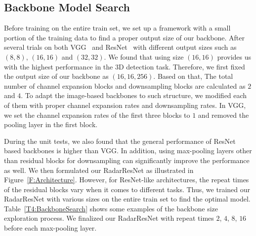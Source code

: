 \documentclass[10pt, conference, compsocconf]{IEEEtran}
\begin{document}

\subsection{Backbone Model Search}

Before training on the entire train set, we set up a framework with a small portion of the training data to find a proper output size of our backbone. After several trials on both VGG~\cite{BG:VGG} and ResNet~\cite{BG:ResNet} with different output sizes such as $(8, 8)$, $(16, 16)$ and $(32, 32)$. We found that using size $(16, 16)$ provides us with the highest performance in the 3D detection task. Therefore, we first fixed the output size of our backbone as $(16, 16, 256)$. Based on that, The total number of channel expansion blocks and downsampling blocks are calculated as $2$ and $4$. To adapt the image-based backbones to such structure, we modified each of them with proper channel expansion rates and downsampling rates. In VGG, we set the channel expansion rates of the first three blocks to $1$ and removed the pooling layer in the first block.

During the unit tests, we also found that the general performance of ResNet based backbones is higher than VGG. In addition, using max-pooling layers other than residual blocks for downsampling can significantly improve the performance as well. We then formulated our RadarResNet as illustrated in Figure~\ref{F:Architecture}. However, for ResNet-like architectures, the repeat times of the residual blocks vary when it comes to different tasks. Thus, we trained our RadarResNet with various sizes on the entire train set to find the optimal model. Table~\ref{T4:BackboneSearch} shows some examples of the backbone size exploration process. We finalized our RadarResNet with repeat times $2$, $4$, $8$, $16$ before each max-pooling layer. 
\end{document}
